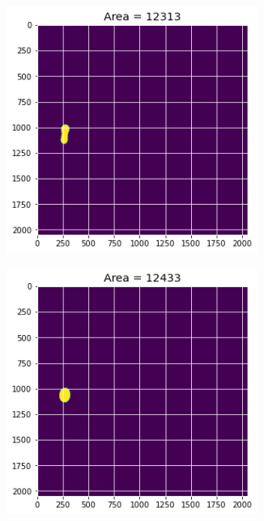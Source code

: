\documentclass[12pt, a4paper]{report}
\begin{document}
\begin{figure}[H]
\begin{subfigure}{.24\textwidth}
  \label{img:microstrImg}
\end{subfigure}
\begin{subfigure}{.24\textwidth}
  \centering
  \includegraphics[width=0.9\textwidth]{Pictures/Growth/2.3.jpeg}
  \label{img:microstrImg}
\end{subfigure}
\begin{subfigure}{.24\textwidth}
  \centering
  \includegraphics[width=0.9\textwidth]{Pictures/Growth/2.4.jpeg}
  \label{img:microstrImg}
\end{subfigure}
\label{fig:test}
\end{figure}
\end{document}
